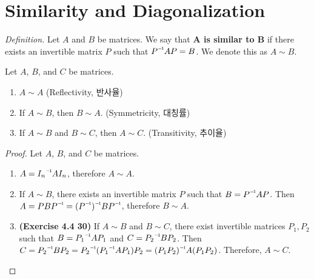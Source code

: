\section{Similarity and Diagonalization}
\textit{Definition.} Let $A$ and $B$ be \nbyn matrices. We say that \textbf{A is similar to B} if there exists an invertible \nbyn matrix $P$ such that $\inv{P}AP = B$. We denote this as $A \sim B$.

\begin{theorem}
	Let $ A $, $ B $, and $ C $ be \nbyn matrices.
	\begin{enumerate}
		\item $ A \sim A $ (Reflectivity, 반사율)
		\item If $ A \sim B $, then $ B \sim A $. (Symmetricity, 대칭률)
		\item If $ A\sim B $ and $ B\sim C $, then $ A\sim C $. (Transitivity, 추이율)
	\end{enumerate}
\end{theorem}
\begin{proof}
	Let $A$, $B$, and $C$ be \nbyn matrices.
	\begin{enumerate}
		\item $A = \inv{I_n}AI_n$, therefore $A \sim A$.
		\item If $A \sim B$, there exists an invertible \nbyn matrix $P$ such that $B = \inv{P}AP$. Then $A = PB\inv{P} = \inv{(\inv{P})}B\inv{P}$, therefore $B \sim A$.
		\item \textbf{(Exercise 4.4 30)} If $A \sim B$ and $B \sim C$, there exist invertible \nbyn matrices $P_1, P_2$ such that $B = \inv{P_1}AP_1$ and $C = \inv{P_2}BP_2$. Then $C = \inv{P_2}BP_2 = \inv{P_2}(\inv{P_1}AP_1)P_2 = \inv{(P_1P_2)}A(P_1P_2)$. Therefore, $A \sim C$.
	\end{enumerate}
\end{proof}

